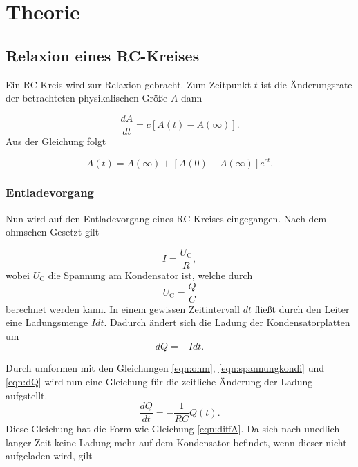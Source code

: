 \section{Theorie}
\label{sec:Theorie}

\subsection{Relaxion eines RC-Kreises}
Ein RC-Kreis wird zur Relaxion gebracht.
Zum Zeitpunkt $t$ ist die Änderungsrate der betrachteten physikalischen Größe $A$ dann

\begin{equation}
    \frac{dA}{dt} = c \left[ A(t) - A(\infty)  \right]  .
    \label{eqn:diffA}
\end{equation}
Aus der Gleichung folgt 

\begin{equation}
    A(t) = A(\infty) + \left[ A(0) - A(\infty)  \right] e^{ct} .
\end{equation}

\subsubsection{Entladevorgang}

Nun wird auf den Entladevorgang eines RC-Kreises eingegangen.
Nach dem ohmschen Gesetzt gilt 

\begin{equation}
    I = \frac{U_\text{C}}{R}, 
    \label{eqn:ohm}
\end{equation}
wobei $U_\text{C}$ die Spannung am Kondensator ist, welche durch
\begin{equation}
    U_\text{C} = \frac{Q}{C}
    \label{eqn:spannungkondi}
\end{equation}
berechnet werden kann.
In einem gewissen Zeitintervall $dt$ fließt durch den Leiter eine Ladungsmenge $Idt$.
Dadurch ändert sich die Ladung der Kondensatorplatten um
\begin{equation}
    dQ = -Idt.
    \label{eqn:dQ}
\end{equation}

Durch umformen mit den Gleichungen \eqref{eqn:ohm}, \eqref{eqn:spannungkondi} und \eqref{eqn:dQ} wird nun eine Gleichung für die zeitliche Änderung der Ladung aufgstellt.
\begin{equation*}
    \frac{dQ}{dt} = - \frac{1}{RC} Q(t).
\end{equation*}
Diese Gleichung hat die Form wie Gleichung \eqref{eqn:diffA}.
Da sich nach unedlich langer Zeit keine Ladung mehr auf dem Kondensator befindet, wenn dieser nicht aufgeladen wird, gilt 

